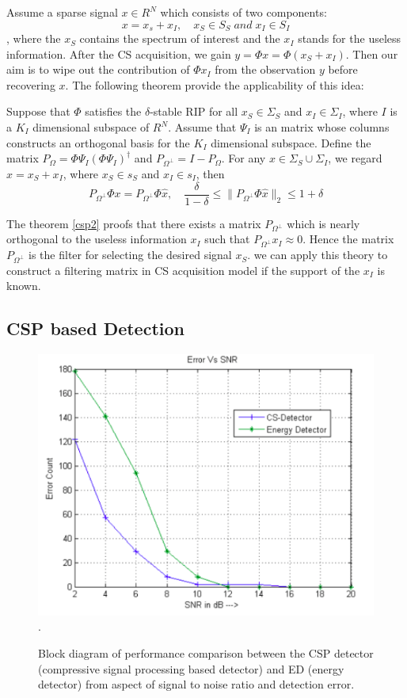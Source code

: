 Assume a sparse signal $x \in R^N$ which consists of two components:
\begin{equation}
\label{csp1}
x = x_s + x_I, \quad x_S \in S_S\; and\; x_I \in S_I
\end{equation}
, where the $x_S$ contains the spectrum of interest and the $x_I$ stands for the useless information. After the CS acquisition, we gain $y = \Phi x = \Phi(x_S + x_I)$. Then our aim is to wipe out the contribution of $\Phi x_I$ from the observation $y$ before recovering $x$. The following theorem provide the applicability of this idea:  
\begin{theorem}\cite{davenport2010signal}
\label{csp2}
Suppose that $\Phi$ satisfies the $\delta$-stable RIP for all $x_S\in\Sigma_S$ and $x_I\in\Sigma_I$, where $I$ is a $K_I$ dimensional subspace of $R^{N}$. Assume that $\Psi_I$ is an matrix whose columns constructs an orthogonal basis for the $K_I$ dimensional subspace. Define the matrix $P_{\Omega} = \Phi\Psi_I(\Phi\Psi_I)^{\dagger}$ and $P_{\Omega^{\perp}} = I-P_{\Omega}$. For any $x \in \Sigma_S \cup \Sigma_I$, we regard $x = x_S + x_I$, where $x_S \in s_S$ and $x_I \in s_I$, then
\begin{equation}
\label{csp3}
P_{\Omega^{\perp}} \Phi x = P_{\Omega^{\perp}} \Phi \hat x ,\quad
\frac{\delta}{1-\delta} \leq \|P_{\Omega^{\perp}} \Phi \hat x\|_2 \leq 1 + \delta 
\end{equation}
\end{theorem}
The theorem \ref{csp2} proofs that there exists a matrix $P_{\Omega^{\perp}}$ which is nearly orthogonal to the useless information $x_I$ such that $P_{\Omega^{\perp}} x_I \approx 0$. Hence the matrix $P_{\Omega^{\perp}}$ is the filter for selecting the desired signal $x_S$. we can apply this theory to construct a filtering matrix in CS acquisition model if the support of the $x_I$ is known. 

\subsection{CSP based Detection}\label{sct:csp_detect}
\begin{figure}[!t]
\centering
\includegraphics[width=0.5\columnwidth]{figs/csp-detec_vs_ED.png}
\DeclareGraphicsExtensions.
\caption{Block diagram of performance comparison between the CSP detector (compressive signal processing based detector) and ED (energy detector) from aspect of signal to noise ratio and detection error.}\label{csp-detec_vs_ED}
\end{figure}

